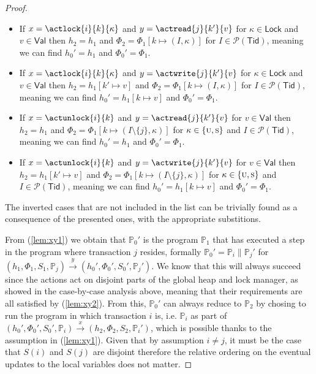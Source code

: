 \begin{lem}
\begin{proof}
\begin{itemize}
		\item If $x = \actlock{i}{k}{\kappa}$ and $y = \actread{j}{k'}{v}$ for $\kappa \in \mathsf{Lock}$ and $v \in \mathsf{Val}$ then $h_2 = h_1$ and $\Phi_2 = \Phi_1[k \mapsto (I, \kappa)]$ for $I \in \mathcal{P}(\mathsf{Tid})$, meaning we can find $h_0' = h_1$ and $\Phi_0' = \Phi_1$.
		
		\item If $x = \actlock{i}{k}{\kappa}$ and $y = \actwrite{j}{k'}{v}$ for $\kappa \in \mathsf{Lock}$ and $v \in \mathsf{Val}$ then $h_2 = h_1[k' \mapsto v]$ and $\Phi_2 = \Phi_1[k \mapsto (I, \kappa)]$ for $I \in \mathcal{P}(\mathsf{Tid})$, meaning we can find $h_0' = h_1[k \mapsto v]$ and $\Phi_0' = \Phi_1$.
		
		\item If $x = \actunlock{i}{k}$ and $y = \actread{j}{k'}{v}$ for $v \in \mathsf{Val}$ then $h_2 = h_1$ and $\Phi_2 = \Phi_1[k \mapsto (I \setminus \{j\}, \kappa)]$ for $\kappa \in \{\textsc{u}, \textsc{s}\}$ and $I \in \mathcal{P}(\mathsf{Tid})$, meaning we can find $h_0' = h_1$ and $\Phi_0' = \Phi_1$.
		
		\item If $x = \actunlock{i}{k}$ and $y = \actwrite{j}{k'}{v}$ for $v \in \mathsf{Val}$ then $h_2 = h_1[k' \mapsto v]$ and $\Phi_2 = \Phi_1[k \mapsto (I \setminus \{j\}, \kappa)]$ for $\kappa \in \{\textsc{u}, \textsc{s}\}$ and $I \in \mathcal{P}(\mathsf{Tid})$, meaning we can find $h_0' = h_1[k \mapsto v]$ and $\Phi_0' = \Phi_1$.
	\end{itemize}
	The inverted cases that are not included in the list can be trivially found as a consequence of the presented ones, with the appropriate substitions.
	
	From (\ref{lem:xy1}) we obtain that $\mathds{P}_0'$ is the program $\mathds{P}_1$ that has executed a step in the program where transaction $j$ resides, formally $\mathds{P}_0' = \mathds{P}_i \| \mathds{P}_j'$ for $(h_1, \Phi_1, S_1, \mathds{P}_j) \xrightarrow{y} (h_0', \Phi_0', S_0', \mathds{P}_j')$. We know that this will always succeed since the actions act on disjoint parts of the global heap and lock manager, as showed in the case-by-case analysis above, meaning that their requirements are all satisfied by (\ref{lem:xy2}). From this, $\mathds{P}_0'$ can always reduce to $\mathds{P}_2$ by chosing to run the program in which transaction $i$ is, i.e. $\mathds{P}_i$ as part of $(h_0', \Phi_0', S_0', \mathds{P}_i) \xrightarrow{x} (h_2, \Phi_2, S_2, \mathds{P}_i')$, which is possible thanks to the assumption in (\ref{lem:xy1}). Given that by assumption $i \neq j$, it must be the case that $S(i)$ and $S(j)$ are disjoint therefore the relative ordering on the eventual updates to the local variables does not matter.
	\end{proof}
\end{lem}


